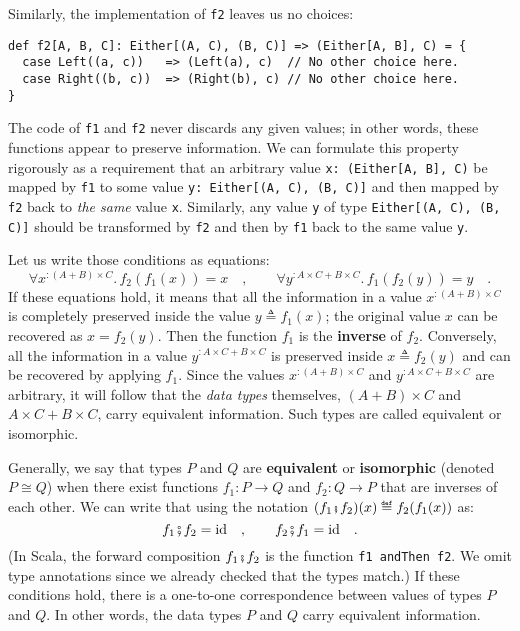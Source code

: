 Similarly, the implementation of \lstinline!f2! leaves us no choices:
\begin{lstlisting}
def f2[A, B, C]: Either[(A, C), (B, C)] => (Either[A, B], C) = {
  case Left((a, c))   => (Left(a), c)  // No other choice here.
  case Right((b, c))  => (Right(b), c) // No other choice here.
}
\end{lstlisting}
The code of \lstinline!f1! and \lstinline!f2! never discards any
given values; in other words, these functions appear to preserve information.
We can formulate this property rigorously as a requirement that an
arbitrary value \lstinline!x: (Either[A, B], C)! be mapped by \lstinline!f1!
to some value \lstinline!y: Either[(A, C), (B, C)]! and then mapped
by \lstinline!f2! back to \emph{the same} value \lstinline!x!. Similarly,
any value \lstinline!y! of type \lstinline!Either[(A, C), (B, C)]!
should be transformed by \lstinline!f2! and then by \lstinline!f1!
back to the same value \lstinline!y!.

Let us write those conditions as equations:
\[
\forall x^{:(A+B)\times C}.\,f_{2}(f_{1}(x))=x\quad,\quad\quad\forall y^{:A\times C+B\times C}.\,f_{1}\left(f_{2}(y)\right)=y\quad.
\]
If these equations hold, it means that all the information in a value
$x^{:(A+B)\times C}$ is completely preserved inside the value $y\triangleq f_{1}(x)$;
the original value $x$ can be recovered as $x=f_{2}(y)$. Then the
function $f_{1}$ is the \textbf{inverse}
of $f_{2}$. Conversely, all the information in a value $y^{:A\times C+B\times C}$
is preserved inside $x\triangleq f_{2}(y)$ and can be recovered by
applying $f_{1}$. Since the values $x^{:(A+B)\times C}$ and $y^{:A\times C+B\times C}$
are arbitrary, it will follow that the \emph{data types} themselves,
$\left(A+B\right)\times C$ and $A\times C+B\times C$, carry equivalent
information. Such types are called equivalent
or isomorphic.

Generally, we say that types $P$ and $Q$ are \textbf{equivalent}
or \textbf{isomorphic} (denoted $P\cong Q$) when
there exist functions $f_{1}:P\rightarrow Q$ and $f_{2}:Q\rightarrow P$
that are inverses of each other. We can write that using the notation
$(f_{1}\bef f_{2})(x)\triangleq f_{2}(f_{1}(x))$ as:
\[
f_{1}\bef f_{2}=\text{id}\quad,\quad\quad f_{2}\bef f_{1}=\text{id}\quad.
\]
(In Scala, the forward composition $f_{1}\bef f_{2}$ is the function
\lstinline!f1 andThen f2!. We omit type annotations since we already
checked that the types match.) If these conditions hold, there is
a one-to-one correspondence between values of types $P$ and $Q$.
In other words, the data types $P$ and $Q$ carry equivalent information.

